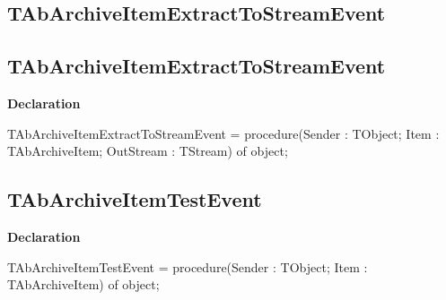 \documentclass{report}
\newif\ifpdf
\begin{document}
\subsection*{\large{\textbf{TAbArchiveItemExtractToStreamEvent}}\normalsize\hspace{1ex}\hrulefill}
\else
\subsection*{TAbArchiveItemExtractToStreamEvent}
\fi
\label{AbArcTyp-TAbArchiveItemExtractToStreamEvent}
\begin{list}{}{
\setlength{\itemindent}{0cm}
\setlength{\listparindent}{0cm}
\setlength{\leftmargin}{\evensidemargin}
\addtolength{\leftmargin}{\tmplength}
\settowidth{\labelsep}{X}
\addtolength{\leftmargin}{\labelsep}
\setlength{\labelwidth}{\tmplength}
}
\item[\textbf{Declaration}\hfill]
\ifpdf
\begin{flushleft}
\fi
\begin{ttfamily}
TAbArchiveItemExtractToStreamEvent = procedure(Sender : TObject; Item : TAbArchiveItem; OutStream : TStream) of object;\end{ttfamily}

\ifpdf
\end{flushleft}
\fi

\end{list}
\ifpdf
\subsection*{\large{\textbf{TAbArchiveItemTestEvent}}\normalsize\hspace{1ex}\hrulefill}
\else
\subsection*{TAbArchiveItemTestEvent}
\fi
\label{AbArcTyp-TAbArchiveItemTestEvent}
\begin{list}{}{
\setlength{\itemindent}{0cm}
\setlength{\listparindent}{0cm}
\setlength{\leftmargin}{\evensidemargin}
\addtolength{\leftmargin}{\tmplength}
\settowidth{\labelsep}{X}
\addtolength{\leftmargin}{\labelsep}
\setlength{\labelwidth}{\tmplength}
}
\item[\textbf{Declaration}\hfill]
\ifpdf
\begin{flushleft}
\fi
\begin{ttfamily}
TAbArchiveItemTestEvent = procedure(Sender : TObject; Item : TAbArchiveItem) of object;\end{ttfamily}

\ifpdf
\end{flushleft}
\fi

\end{list}
\ifpdf
\end{document}
